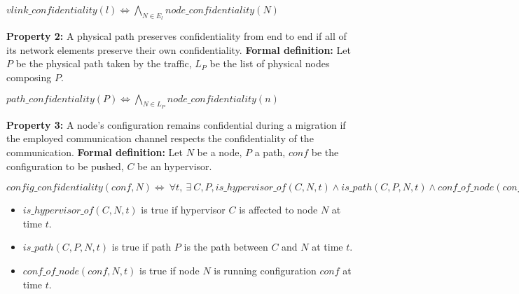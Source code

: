 \begin{myformula}
$vlink\_confidentiality(l) \Leftrightarrow \bigwedge\limits_{N\in E_l} node\_confidentiality(N) $
\end{myformula}

\textbf{Property 2:} A physical path preserves confidentiality from end to end if all of its network elements preserve their own confidentiality.
\newline \textbf{Formal definition:} Let $P$ be the physical path taken by the traffic, $L_P$ be the list of physical nodes composing $P$.

\begin{myformula}
$path\_confidentiality(P) \Leftrightarrow \bigwedge\limits_{N \in L_P}node\_confidentiality(n)$
\end{myformula}


\textbf{Property 3:} A node's configuration remains confidential during a migration if the employed communication channel respects the confidentiality of the communication.
\newline \textbf{Formal definition:} Let $N$ be a node, $P$ a path, $conf$ be the configuration to be pushed, $C$ be an hypervisor.
\newline

\begin{myformula}
$config\_confidentiality(conf,N) \Leftrightarrow~\forall t,~\exists~C,P, 
is\_hypervisor\_of(C,N,t) \wedge is\_path(C,P,N,t) \wedge  conf\_of\_node(conf,N,t) \Rightarrow
~path\_confidentiality(P) \wedge  node\_confidentiality(N)
$
\end{myformula}


\begin{itemize}
\item $is\_hypervisor\_of(C,N,t)$ is true if hypervisor $C$ is affected to node $N$ at time $t$. 
\item $is\_path(C,P,N,t)$ is true if path $P$ is the path between $C$ and $N$ at time $t$.
\item $conf\_of\_node(conf,N,t)$ is true if node $N$ is running configuration $conf$ at time $t$.
\end{itemize}

